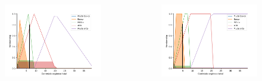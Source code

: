 \documentclass[aspectratio=169]{beamer} %
\begin{document}
{{{{{{{{\begin{frame}
\begin{flushright}
\begin{columns}
        \centering
         \begin{figure}
		\centering
		\includegraphics[scale=0.4]{images/COT_Tanganyika_triangular.png}
	\end{figure}
	     	
        \centering
         \begin{figure}
		\centering
		\includegraphics[scale=0.4]{images/COT_Tanganyika_trapezoidal.png}
	\end{figure}
    \end{columns}

\end{flushright}


\end{frame}}}}}}}}}
\end{document}
